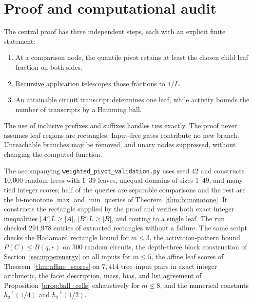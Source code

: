 \documentclass[11pt]{article}
\theoremstyle{definition}
\begin{document}
\appendix
\section{Proof and computational audit}\label{sec:audit}
The central proof has three independent steps, each with an explicit finite statement:
\begin{enumerate}
 \item At a comparison node, the quantile pivot retains at least the chosen child leaf fraction on both sides.
 \item Recursive application telescopes those fractions to \(1/L\).
 \item An attainable circuit transcript determines one leaf, while activity bounds the number of transcripts by a Hamming ball.
\end{enumerate}
The use of inclusive prefixes and suffixes handles ties exactly. The proof never assumes leaf regions are rectangles. Input-free gates contribute no new branch. Unreachable branches may be removed, and unary nodes suppressed, without changing the computed function.

The accompanying \texttt{weighted\_pivot\_validation.py} uses seed \(42\) and constructs 10,000 random trees with 1--39 leaves, unequal domains of sizes 1--49, and many tied integer scores; half of the queries are separable comparisons and the rest are the bi-monotone \(\max\) and \(\min\) queries of Theorem~\ref{thm:bimonotone}. It constructs the rectangle supplied by the proof and verifies both exact integer inequalities
\(|A'|L\ge|A|\), \(|B'|L\ge|B|\), and routing to a single leaf. The run checked 291,978 entries of extracted rectangles without a failure. The same script checks the Hadamard rectangle bound for \(m\le3\), the activation-pattern bound \(P(C)\le B(q,e)\) on 300 random circuits, the depth-three block construction of Section~\ref{sec:upperenergy} on all inputs for \(m\le5\), the affine leaf scores of Theorem~\ref{thm:affine_scores} on \(7{,}414\) tree--input pairs in exact integer arithmetic, the facet description, mass, bias, and list agreement of Proposition~\ref{prop:ball_cells} exhaustively for \(m\le8\), and the numerical constants \(h_2^{-1}(1/4)\) and \(h_2^{-1}(1/2)\).
\end{document}
